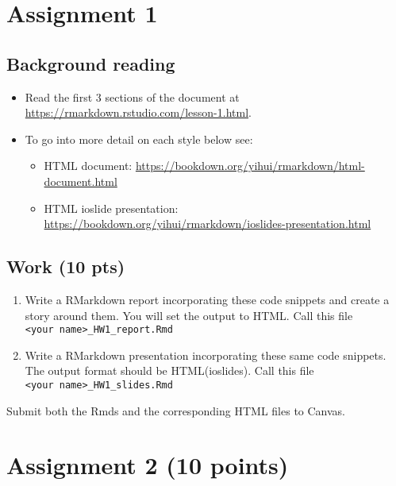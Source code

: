 \documentclass[
]{article}
\providecommand{\tightlist}{%
  \setlength{\itemsep}{0pt}\setlength{\parskip}{0pt}}
\begin{document}
\hypertarget{assignment-1}{%
\section{Assignment 1}\label{assignment-1}}

\hypertarget{background-reading}{%
\subsection{Background reading}\label{background-reading}}

\begin{itemize}
\tightlist
\item
  Read the first 3 sections of the document at
  \url{https://rmarkdown.rstudio.com/lesson-1.html}.
\item
  To go into more detail on each style below see:

  \begin{itemize}
  \tightlist
  \item
    HTML document:
    \url{https://bookdown.org/yihui/rmarkdown/html-document.html}
  \item
    HTML ioslide presentation:
    \url{https://bookdown.org/yihui/rmarkdown/ioslides-presentation.html}
  \end{itemize}
\end{itemize}

\hypertarget{work-10-pts}{%
\subsection{Work (10 pts)}\label{work-10-pts}}

\begin{enumerate}
\def\labelenumi{\arabic{enumi}.}
\tightlist
\item
  Write a RMarkdown report incorporating these code snippets and create
  a story around them. You will set the output to HTML. Call this file
  \texttt{\textless{}your\ name\textgreater{}\_HW1\_report.Rmd}
\item
  Write a RMarkdown presentation incorporating these same code snippets.
  The output format should be HTML(ioslides). Call this file
  \texttt{\textless{}your\ name\textgreater{}\_HW1\_slides.Rmd}
\end{enumerate}

Submit both the Rmds and the corresponding HTML files to Canvas.

\hypertarget{assignment-2-10-points}{%
\section{Assignment 2 (10 points)}\label{assignment-2-10-points}}
\end{document}
